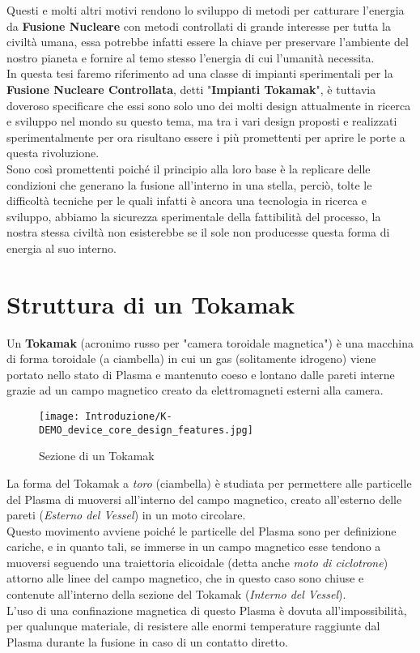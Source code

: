 \noindent
Questi e molti altri motivi rendono lo sviluppo di metodi per catturare l'energia da \textbf{Fusione Nucleare} con metodi controllati di grande interesse per tutta la civiltà umana, essa potrebbe infatti essere la chiave per preservare l'ambiente del nostro pianeta e fornire al temo stesso l'energia di cui l'umanità necessita.\\
In questa tesi faremo riferimento ad una classe di impianti sperimentali per la \textbf{Fusione Nucleare Controllata}, detti "\textbf{Impianti Tokamak}", è tuttavia doveroso specificare che essi sono solo uno dei molti design attualmente in ricerca e sviluppo nel mondo su questo tema, ma tra i vari design proposti e realizzati sperimentalmente per ora risultano essere i più promettenti per aprire le porte a questa rivoluzione.\\
Sono così promettenti poiché il principio alla loro base è la replicare delle condizioni che generano la fusione all'interno in una stella, perciò, tolte le difficoltà tecniche per le quali infatti è ancora una tecnologia in ricerca e sviluppo, abbiamo la sicurezza sperimentale della fattibilità del processo, la nostra stessa civiltà non esisterebbe se il sole non producesse questa forma di energia al suo interno.
\newpage

\section*{Struttura di un Tokamak}
Un \textbf{Tokamak} (acronimo russo per "camera toroidale magnetica") è una macchina di forma toroidale (a ciambella) in cui un gas (solitamente idrogeno) viene portato nello stato di Plasma e mantenuto coeso e lontano dalle pareti interne grazie ad un campo magnetico creato da elettromagneti esterni alla camera.
\begin{figure}[H]
	\centering
	\caption[Sezione di un Tokamak]{Sezione di un Tokamak}
	\texttt{[image: Introduzione/K-DEMO\_device\_core\_design\_features.jpg]}
\end{figure}

\noindent
La forma del Tokamak a \textit{toro} (ciambella) è studiata per permettere alle particelle del Plasma di muoversi all'interno del campo magnetico, creato all'esterno delle pareti (\textit{Esterno del Vessel}) in un moto circolare.\\
Questo movimento avviene poiché le particelle del Plasma sono per definizione cariche, e in quanto tali, se immerse in un campo magnetico esse tendono a muoversi seguendo una traiettoria elicoidale (detta anche \textit{moto di ciclotrone}) attorno alle linee del campo magnetico, che in questo caso sono chiuse e contenute all'interno della sezione del Tokamak (\textit{Interno del Vessel}).\\
L'uso di una confinazione magnetica di questo Plasma è dovuta all'impossibilità, per qualunque materiale, di resistere alle enormi temperature raggiunte dal Plasma durante la fusione in caso di un contatto diretto.\\

